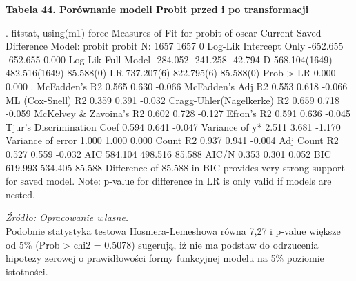 \vspace{0.5cm}
\textbf{Tabela 44. Porównanie modeli Probit przed i po transformacji}
\begin{stlog}
. fitstat, using(m1) force
{\smallskip}
Measures of Fit for probit of oscar
{\smallskip}
                               Current             Saved        Difference
Model:                          probit            probit
N:                                1657              1657                 0
Log-Lik Intercept Only        -652.655          -652.655             0.000
Log-Lik Full Model            -284.052          -241.258           -42.794
D                              568.104(1649)     482.516(1649)      85.588(0)
LR                             737.207(6)        822.795(6)         85.588(0)
Prob > LR                        0.000             0.000                 .
McFadden's R2                    0.565             0.630            -0.066
McFadden's Adj R2                0.553             0.618            -0.066
ML (Cox-Snell) R2                0.359             0.391            -0.032
Cragg-Uhler(Nagelkerke) R2       0.659             0.718            -0.059
McKelvey \& Zavoina's R2          0.602             0.728            -0.127
Efron's R2                       0.591             0.636            -0.045
Tjur's Discrimination Coef       0.594             0.641            -0.047
Variance of y*                   2.511             3.681            -1.170
Variance of error                1.000             1.000             0.000
Count R2                         0.937             0.941            -0.004
Adj Count R2                     0.527             0.559            -0.032
AIC                            584.104           498.516            85.588
AIC/N                            0.353             0.301             0.052
BIC                            619.993           534.405            85.588
{\smallskip}
Difference of   85.588 in BIC provides very strong support for saved model.
{\smallskip}
Note: p-value for difference in LR is only valid if models are nested.
\end{stlog}
\textit{\footnotesize{Źródło: Opracowanie własne.}} \\

Podobnie statystyka testowa Hosmera-Lemeshowa równa 7,27 i p-value większe od 5\% (Prob > chi2 = 0.5078) sugerują, iż nie ma podstaw do odrzucenia hipotezy zerowej o prawidłowości formy funkcyjnej modelu na 5\% poziomie istotności. 

